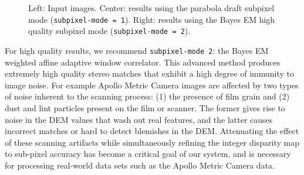 \begin{figure}[tb]

\caption{Left: Input images.  Center: results using the parabola draft
  subpixel mode (\texttt{subpixel-mode = 1}). Right: results using the Bayes
  EM high quality subpixel mode (\texttt{subpixel-mode = 2}).}
\label{fig:parabola_results}
\end{figure}

For high quality results, we recommend \texttt{subpixel-mode 2}:
the Bayes EM weighted affine adaptive window correlator.  This
advanced method produces extremely high quality stereo matches that
exhibit a high degree of immunity to image noise.  For example
Apollo Metric Camera images are affected by two types of noise
inherent to the scanning process: (1) the presence of film grain
and (2) dust and lint particles present on the film or scanner.
The former gives rise to noise in the \ac{DEM} values that wash out real
features, and the latter causes incorrect matches or hard to detect
blemishes in the \ac{DEM}.  Attenuating the effect of these scanning
artifacts while simultaneously refining the integer disparity map
to sub-pixel accuracy has become a critical goal of our system, and
is necessary for processing real-world data sets such as the Apollo
Metric Camera data.

